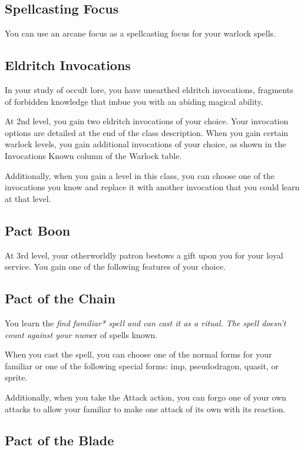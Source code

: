 \subsection{Spellcasting Focus}

You can use an arcane focus as a spellcasting focus for your warlock spells.

\subsection{Eldritch Invocations}

In your study of occult lore, you have unearthed eldritch invocations, fragments of forbidden knowledge that imbue you with an abiding magical ability.

At 2nd level, you gain two eldritch invocations of your choice. Your invocation options are detailed at the end of the class description. When you gain certain warlock levels, you gain additional invocations of your choice, as shown in the Invocations Known column of the Warlock table.

Additionally, when you gain a level in this class, you can choose one of the invocations you know and replace it with another invocation that you could learn at that level.

\subsection{Pact Boon}

At 3rd level, your otherworldly patron bestows a gift upon you for your loyal service. You gain one of the following features of your choice.

\subsection{Pact of the Chain}

You learn the \textit{find familiar* spell and can cast it as a ritual. The spell doesn’t count against your num}er of spells known.

When you cast the spell, you can choose one of the normal forms for your familiar or one of the following special forms: imp, pseudodragon, quasit, or sprite.

Additionally, when you take the Attack action, you can forgo one of your own attacks to allow your familiar to make one attack of its own with its reaction.

\subsection{Pact of the Blade}

